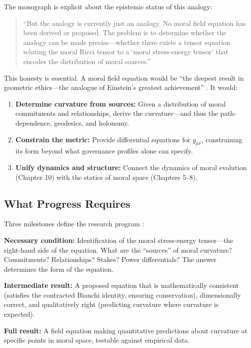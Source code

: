 \documentclass[12pt,letterpaper]{article}
\theoremstyle{definition}
\begin{document}
The monograph is explicit about the epistemic status of this analogy:

\begin{quote}
``But the analogy is currently just an analogy. No moral field equation has been derived or proposed. The problem is to determine whether the analogy can be made precise---whether there exists a tensor equation relating the moral Ricci tensor to a `moral stress-energy tensor' that encodes the distribution of moral sources.'' \cite[\S19.4]{bond2026ge}
\end{quote}

This honesty is essential. A moral field equation would be ``the deepest result in geometric ethics---the analogue of Einstein's greatest achievement'' \cite[\S19.4]{bond2026ge}. It would:

\begin{enumerate}
    \item \textbf{Determine curvature from sources:} Given a distribution of moral commitments and relationships, derive the curvature---and thus the path-dependence, geodesics, and holonomy.
    \item \textbf{Constrain the metric:} Provide differential equations for $g_{\mu\nu}$, constraining its form beyond what governance profiles alone can specify.
    \item \textbf{Unify dynamics and structure:} Connect the dynamics of moral evolution (Chapter 10) with the statics of moral space (Chapters 5--8).
\end{enumerate}

\subsection{What Progress Requires}

Three milestones define the research program \cite[\S19.4]{bond2026ge}:

\textbf{Necessary condition:} Identification of the moral stress-energy tensor---the right-hand side of the equation. What are the ``sources'' of moral curvature? Commitments? Relationships? Stakes? Power differentials? The answer determines the form of the equation.

\textbf{Intermediate result:} A proposed equation that is mathematically consistent (satisfies the contracted Bianchi identity, ensuring conservation), dimensionally correct, and qualitatively right (predicting curvature where curvature is expected).

\textbf{Full result:} A field equation making quantitative predictions about curvature at specific points in moral space, testable against empirical data.
\end{document}
